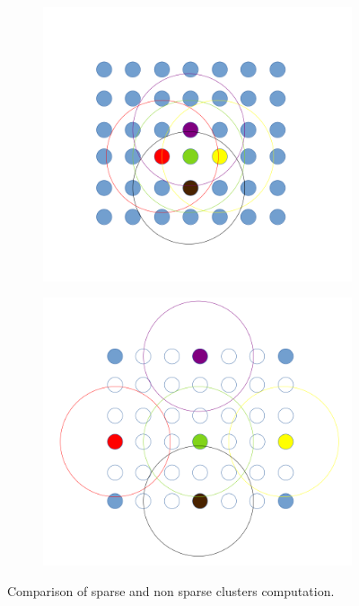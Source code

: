 \begin{figure}[h]
	\begin{center}
		\begin{subfigure}[b]{0.4\textwidth}
			\includegraphics[width=\textwidth]{figures/FullDomainClusters.png}
			\caption{} \label{fig:mls_clusters_sparse_generations_nonsparse}
		\end{subfigure}
		\begin{subfigure}[b]{0.4\textwidth}
			\includegraphics[width=\textwidth]{figures/PartialDomainClusters.png}
			\caption{} \label{fig:mls_clusters_sparse_generations_sparse}
		\end{subfigure}
	\end{center}
	\caption{Comparison of sparse and non sparse clusters computation.} \label{fig:mls_clusters_sparse_generations}
\end{figure} 
